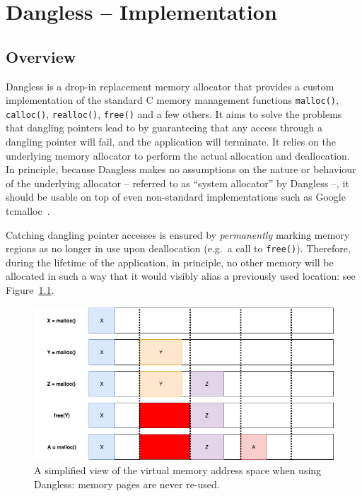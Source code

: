 \chapter{Dangless -- Implementation}
\label{ch:implementation}

\section{Overview}

Dangless is a drop-in replacement memory allocator that provides a custom implementation of the standard C memory management functions \lstinline!malloc()!, \lstinline!calloc()!, \lstinline!realloc()!, \lstinline!free()! and a few others. It aims to solve the problems that dangling pointers lead to by guaranteeing that any access through a dangling pointer will fail, and the application will terminate. It relies on the underlying memory allocator to perform the actual allocation and deallocation. In principle, because Dangless makes no assumptions on the nature or behaviour of the underlying allocator -- referred to as ``system allocator'' by Dangless --, it should be usable on top of even non-standard implementations such as Google tcmalloc~\cite{google-tcmalloc}.

Catching dangling pointer accesses is ensured by \emph{permanently} marking memory regions as no longer in use upon deallocation (e.g.\ a call to \lstinline!free()!). Therefore, during the lifetime of the application, in principle, no other memory will be allocated in such a way that it would visibly alias a previously used location: see Figure~\ref{fig:dangless_simplified}.

\begin{figure}
	\centering
	\includegraphics[width=\textwidth]{img/dangless_simplified.png}
	\caption{A simplified view of the virtual memory address space when using Dangless: memory pages are never re-used.}
	\label{fig:dangless_simplified}
\end{figure}

